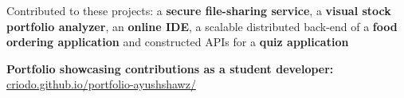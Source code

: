 \documentclass[]{deedy-resume-openfont}
\begin{document}
\begin{minipage}[t]{0.66\textwidth}
\begin{tightemize}
\item Contributed to these projects: a \textbf{secure file-sharing service}, a \textbf{visual stock portfolio analyzer}, an \textbf{online IDE}, a scalable distributed back-end of a \textbf{food ordering application} and constructed APIs for a \textbf{quiz application}\\
\end{tightemize}



\setlength\parindent{24pt} \textbf{Portfolio showcasing contributions as a student developer:} \\ 
\href{https://criodo.github.io/portfolio-ayushshawz/}{criodo.github.io/portfolio-ayushshawz/}\\
\setlength\parindent{0pt}




\end{minipage}
\end{document}
